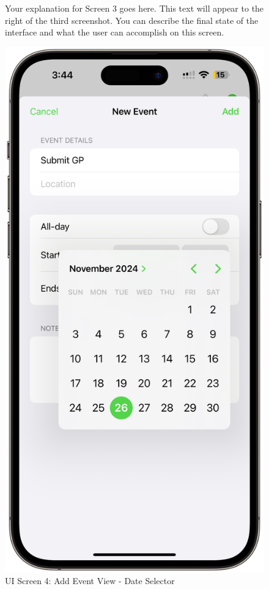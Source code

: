 \begin{figure}[!h]
    \begin{minipage}{0.65\textwidth}
        Your explanation for Screen 3 goes here. This text will appear to the right 
        of the third screenshot. You can describe the final state of the interface 
        and what the user can accomplish on this screen.
    \end{minipage}
    \hfill
    \begin{minipage}{0.3\textwidth}
        \centering
        \includegraphics[width=\textwidth]{images/screen4.png}
        \caption{UI Screen 4: Add Event View - Date Selector}
        \label{fig:ui-screen-4}
    \end{minipage}
\end{figure}

